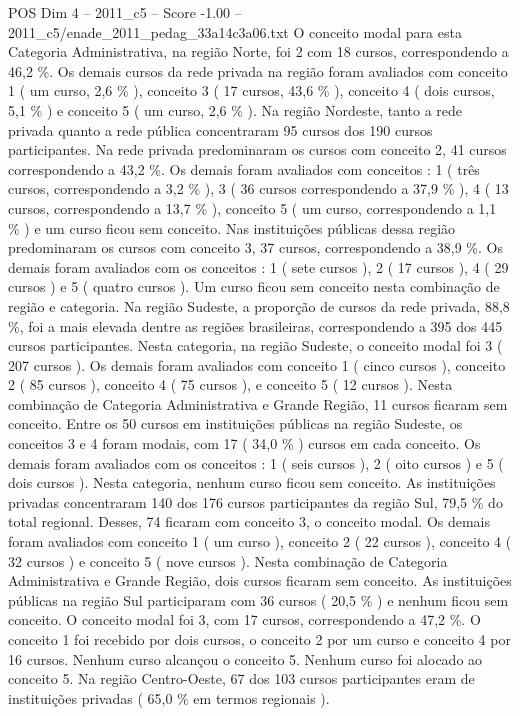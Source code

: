 \begin{textsample}{POS Dim 4 – 2011\_c5 – Score -1.00 – 2011\_c5/enade\_2011\_pedag\_33a14c3a06.txt}
O conceito modal para esta Categoria Administrativa, na região Norte, foi 2 com 18 cursos, correspondendo a 46,2 \%.
Os demais cursos da rede privada na região foram avaliados com conceito 1 ( um curso, 2,6 \% ), conceito 3 ( 17 cursos, 43,6 \% ), conceito 4 ( dois cursos, 5,1 \% ) e conceito 5 ( um curso, 2,6 \% ).
Na região Nordeste, tanto a rede privada quanto a rede pública concentraram 95 cursos dos 190 cursos participantes.
Na rede privada predominaram os cursos com conceito 2, 41 cursos correspondendo a 43,2 \%.
Os demais foram avaliados com conceitos : 1 ( três cursos, correspondendo a 3,2 \% ), 3 ( 36 cursos correspondendo a 37,9 \% ), 4 ( 13 cursos, correspondendo a 13,7 \% ), conceito 5 ( um curso, correspondendo a 1,1 \% ) e um curso ficou sem conceito.
Nas instituições públicas dessa região predominaram os cursos com conceito 3, 37 cursos, correspondendo a 38,9 \%.
Os demais foram avaliados com os conceitos : 1 ( sete cursos ), 2 ( 17 cursos ), 4 ( 29 cursos ) e 5 ( quatro cursos ).
Um curso ficou sem conceito nesta combinação de região e categoria.
Na região Sudeste, a proporção de cursos da rede privada, 88,8 \%, foi a mais elevada dentre as regiões brasileiras, correspondendo a 395 dos 445 cursos participantes.
Nesta categoria, na região Sudeste, o conceito modal foi 3 ( 207 cursos ).
Os demais foram avaliados com conceito 1 ( cinco cursos ), conceito 2 ( 85 cursos ), conceito 4 ( 75 cursos ), e conceito 5 ( 12 cursos ).
Nesta combinação de Categoria Administrativa e Grande Região, 11 cursos ficaram sem conceito.
Entre os 50 cursos em instituições públicas na região Sudeste, os conceitos 3 e 4 foram modais, com 17 ( 34,0 \% ) cursos em cada conceito.
Os demais foram avaliados com os conceitos : 1 ( seis cursos ), 2 ( oito cursos ) e 5 ( dois cursos ).
Nesta categoria, nenhum curso ficou sem conceito.
As instituições privadas concentraram 140 dos 176 cursos participantes da região Sul, 79,5 \% do total regional.
Desses, 74 ficaram com conceito 3, o conceito modal.
Os demais foram avaliados com conceito 1 ( um curso ), conceito 2 ( 22 cursos ), conceito 4 ( 32 cursos ) e conceito 5 ( nove cursos ).
Nesta combinação de Categoria Administrativa e Grande Região, dois cursos ficaram sem conceito.
As instituições públicas na região Sul participaram com 36 cursos ( 20,5 \% ) e nenhum ficou sem conceito.
O conceito modal foi 3, com 17 cursos, correspondendo a 47,2 \%.
O conceito 1 foi recebido por dois cursos, o conceito 2 por um curso e conceito 4 por 16 cursos.
Nenhum curso alcançou o conceito 5.
Nenhum curso foi alocado ao conceito 5.
Na região Centro-Oeste, 67 dos 103 cursos participantes eram de instituições privadas ( 65,0 \% em termos regionais ).

\end{textsample}
